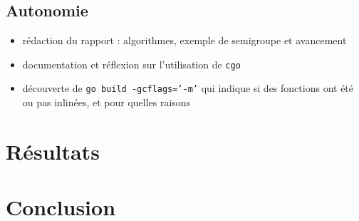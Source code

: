 \documentclass[12pt,a4paper]{article}
\begin{document}
\subsection*{Autonomie}
\begin{itemize}
	\item	rédaction du rapport : algorithmes, exemple de semigroupe et avancement
	\item	documentation et réflexion sur l'utilisation de \texttt{cgo}
	\item	découverte de \texttt{go build -gcflags='-m'} qui indique si des fonctions ont été ou pas inlinées, et pour quelles raisons
\end{itemize}

\section*{Résultats}

\section*{Conclusion}
\end{document}
